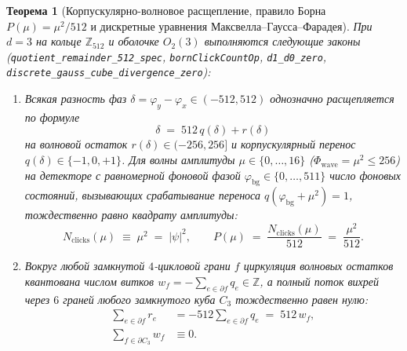\documentclass[11pt,a4paper]{article}
\theoremstyle{plain}
\newtheorem{theorem}{Теорема}[section]
\theoremstyle{definition}
\begin{document}
\begin{theorem}[Корпускулярно-волновое расщепление, правило Борна $P(\mu)=\mu^2/512$ и дискретные уравнения Максвелла--Гаусса--Фарадея]
\label{thm:born-maxwell}
При $d=3$ на кольце $\mathbb{Z}_{512}$ и оболочке $O_2(3)$ выполняются следующие законы (\texttt{quotient\_remainder\_512\_spec}, \texttt{bornClickCountOp}, \texttt{d1\_d0\_zero}, \texttt{discrete\_gauss\_cube\_divergence\_zero}):
\begin{enumerate}[label=\textbf{(\arabic*)},leftmargin=*]
\item Всякая разность фаз $\delta = \varphi_y - \varphi_x \in (-512, 512)$ однозначно расщепляется по формуле
  \begin{equation}
    \label{eq:phase-qr-split}
    \delta \;=\; 512\,q(\delta) + r(\delta)
  \end{equation}
  на волновой остаток $r(\delta) \in (-256, 256]$ и корпускулярный перенос $q(\delta) \in \{-1, 0, +1\}$. Для волны амплитуды $\mu \in \{0, \dots, 16\}$ ($\Phi_{\mathrm{wave}} = \mu^2 \le 256$) на детекторе с равномерной фоновой фазой $\varphi_{\mathrm{bg}} \in \{0, \dots, 511\}$ число фоновых состояний, вызывающих срабатывание переноса $q(\varphi_{\mathrm{bg}} + \mu^2) = 1$, тождественно равно квадрату амплитуды:
  \begin{equation}
    \label{eq:born-rule-exact}
    N_{\mathrm{clicks}}(\mu) \;\equiv\; \mu^2 \;=\; |\psi|^2,
    \qquad
    P(\mu) \;=\; \frac{N_{\mathrm{clicks}}(\mu)}{512} \;=\; \frac{\mu^2}{512}.
  \end{equation}
\item Вокруг любой замкнутой $4$-цикловой грани $f$ циркуляция волновых остатков квантована числом витков $w_f = -\sum_{e\in\partial f} q_e \in \mathbb{Z}$, а полный поток вихрей через $6$ граней любого замкнутого куба $C_3$ тождественно равен нулю:
  \begin{align}
    \sum_{e\in\partial f} r_e &= -512\sum_{e\in\partial f} q_e \;=\; 512\,w_f, \label{eq:maxwell-faraday-circulation} \\
    \sum_{f\in\partial C_3} w_f &\equiv 0. \label{eq:maxwell-gauss-monopole-free}
  \end{align}
\end{enumerate}
\end{theorem}
\end{document}

